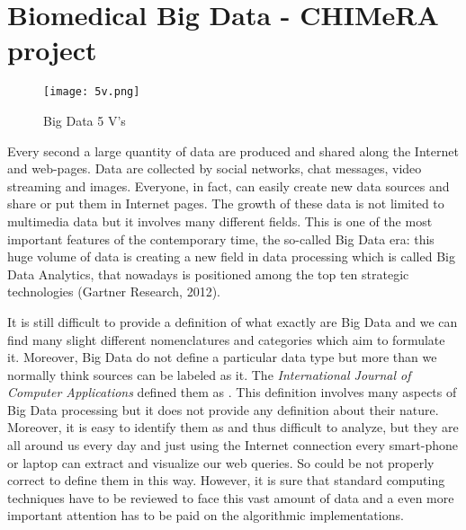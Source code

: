 \documentclass{standalone}
\begin{document}
\chapter[Big Data]{Biomedical Big Data - CHIMeRA project}\label{chapter3:bigdata}

\begin{center}
\begin{figure}[htbp]
\centering
\texttt{[image: 5v.png]}
\caption{Big Data 5 V's}
\label{fig:5v}
\end{figure}
\end{center}

Every second a large quantity of data are produced and shared along the Internet and web-pages.
Data are collected by social networks, chat messages, video streaming and images.
Everyone, in fact, can easily create new data sources and share or put them in Internet pages.
The growth of these data is not limited to multimedia data but it involves many different fields.
This is one of the most important features of the contemporary time, the so-called Big Data era: this huge volume of data is creating a new field in data processing which is called Big Data Analytics, that nowadays is positioned among the top ten strategic technologies (Gartner Research, 2012).

It is still difficult to provide a definition of what exactly are Big Data and we can find many slight different nomenclatures and categories which aim to formulate it.
Moreover, Big Data do not define a particular data type but more than we normally think sources can be labeled as it.
The \emph{International Journal of Computer Applications} defined them as .
This definition involves many aspects of Big Data processing but it does not provide any definition about their nature.
Moreover, it is easy to identify them as  and thus difficult to analyze, but they are all around us every day and just using the Internet connection every smart-phone or laptop can extract and visualize our web queries.
So could be not properly correct to define them in this way.
However, it is sure that standard computing techniques have to be reviewed to face this vast amount of data and a even more important attention has to be paid on the algorithmic implementations.
\end{document}
